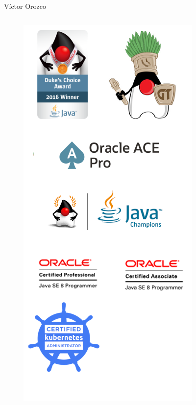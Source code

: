 \documentclass[aspectratio=169]{beamer}
\begin{document}
	\begin{frame}{Víctor Orozco}
		\begin{columns}[T]
			
			\begin{column}[T]{4cm}
				\begin{figure}
					\centering
					\includegraphics[width=0.8\linewidth]{Images/logos}
				\end{figure}
			\end{column}
			\begin{column}[T]{6cm}

\end{column}
\end{columns}
\end{frame}
\end{document}
